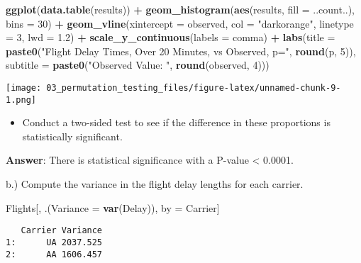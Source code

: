 \documentclass[
  12pt,
]{report}
\newenvironment{Shaded}{\begin{snugshade}}{\end{snugshade}}
\newcommand{\DataTypeTok}[1]{\textcolor[rgb]{0.13,0.29,0.53}{#1}}
\newcommand{\DecValTok}[1]{\textcolor[rgb]{0.00,0.00,0.81}{#1}}
\newcommand{\FloatTok}[1]{\textcolor[rgb]{0.00,0.00,0.81}{#1}}
\newcommand{\KeywordTok}[1]{\textcolor[rgb]{0.13,0.29,0.53}{\textbf{#1}}}
\newcommand{\NormalTok}[1]{#1}
\newcommand{\OperatorTok}[1]{\textcolor[rgb]{0.81,0.36,0.00}{\textbf{#1}}}
\newcommand{\StringTok}[1]{\textcolor[rgb]{0.31,0.60,0.02}{#1}}
\providecommand{\tightlist}{%
  \setlength{\itemsep}{0pt}\setlength{\parskip}{0pt}}
\begin{document}
\begin{Shaded}
\begin{Highlighting}[]
\KeywordTok{ggplot}\NormalTok{(}\KeywordTok{data.table}\NormalTok{(results)) }\OperatorTok{+}
\StringTok{   }\KeywordTok{geom_histogram}\NormalTok{(}\KeywordTok{aes}\NormalTok{(results, }\DataTypeTok{fill =}\NormalTok{ ..count..), }\DataTypeTok{bins =} \DecValTok{30}\NormalTok{) }\OperatorTok{+}
\StringTok{   }\KeywordTok{geom_vline}\NormalTok{(}\DataTypeTok{xintercept =}\NormalTok{ observed, }\DataTypeTok{col =} \StringTok{"darkorange"}\NormalTok{, }\DataTypeTok{linetype =} \DecValTok{3}\NormalTok{, }\DataTypeTok{lwd =} \FloatTok{1.2}\NormalTok{) }\OperatorTok{+}
\StringTok{   }\KeywordTok{scale_y_continuous}\NormalTok{(}\DataTypeTok{labels =}\NormalTok{ comma) }\OperatorTok{+}
\StringTok{   }\KeywordTok{labs}\NormalTok{(}\DataTypeTok{title =} \KeywordTok{paste0}\NormalTok{(}\StringTok{"Flight Delay Times, Over 20 Minutes, vs Observed, p="}\NormalTok{, }\KeywordTok{round}\NormalTok{(p, }\DecValTok{5}\NormalTok{)), }
        \DataTypeTok{subtitle =} \KeywordTok{paste0}\NormalTok{(}\StringTok{"Observed Value: "}\NormalTok{, }\KeywordTok{round}\NormalTok{(observed, }\DecValTok{4}\NormalTok{)))}
\end{Highlighting}
\end{Shaded}

\texttt{[image: 03\_permutation\_testing\_files/figure-latex/unnamed-chunk-9-1.png]}

\begin{itemize}
\tightlist
\item
  Conduct a two-sided test to see if the difference in these proportions
  is statistically significant.
\end{itemize}

\textbf{Answer}: There is statistical significance with a P-value
\textless{} 0.0001.

b.) Compute the variance in the flight delay lengths for each carrier.

\begin{Shaded}
\begin{Highlighting}[]
\NormalTok{Flights[, .(}\DataTypeTok{Variance =} \KeywordTok{var}\NormalTok{(Delay)), by =}\StringTok{ }\NormalTok{Carrier]}
\end{Highlighting}
\end{Shaded}

\begin{verbatim}
   Carrier Variance
1:      UA 2037.525
2:      AA 1606.457
\end{verbatim}
\end{document}
